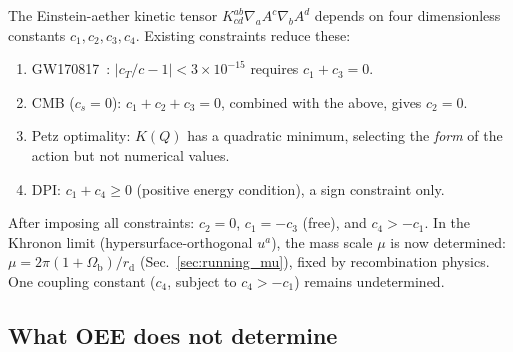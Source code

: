 \documentclass[prd,twocolumn,superscriptaddress,longbibliography,floatfix]{revtex4-2}
\begin{document}
The Einstein-aether kinetic tensor
$K^{ab}_{cd}\nabla_a A^c \nabla_b A^d$ depends on four
dimensionless constants $c_1, c_2, c_3, c_4$.
Existing constraints reduce these:
\begin{enumerate}
\item GW170817~\cite{GW170817}: $|c_T/c - 1| < 3 \times
  10^{-15}$ requires $c_1 + c_3 = 0$.
\item CMB ($c_s = 0$): $c_1 + c_2 + c_3 = 0$, combined
  with the above, gives $c_2 = 0$.
\item Petz optimality: $K(Q)$ has a quadratic minimum,
  selecting the \emph{form} of the action but not
  numerical values.
\item DPI: $c_1 + c_4 \geq 0$ (positive energy
  condition), a sign constraint only.
\end{enumerate}
After imposing all constraints:
$c_2 = 0$, $c_1 = -c_3$ (free), and $c_4 > -c_1$.
In the Khronon limit (hypersurface-orthogonal $u^a$),
the mass scale $\mu$ is now determined:
$\mu = 2\pi(1+\Omega_{\mathrm{b}})/r_{\mathrm{d}}$
(Sec.~\ref{sec:running_mu}), fixed by recombination
physics.  One coupling constant
($c_4$, subject to $c_4 > -c_1$) remains
undetermined.

\subsection{What OEE does not determine}
\label{sec:OEE_limitations}
\end{document}
